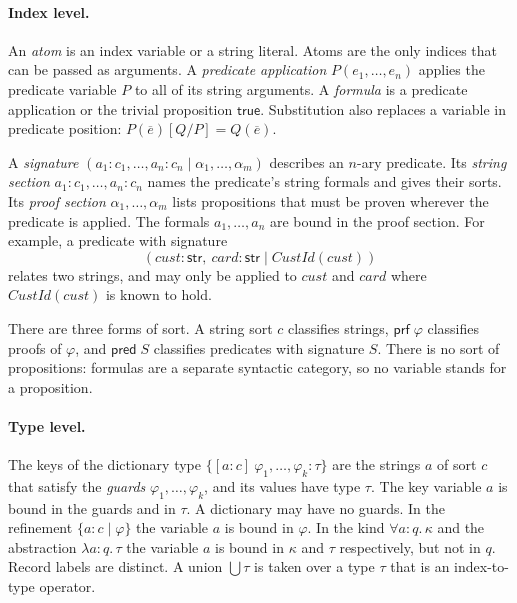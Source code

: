 \documentclass[11pt]{article}
\newcommand{\kw}[1]{\mathsf{#1}}
\newcommand{\str}{\kw{str}}
\newcommand{\prf}[1]{\kw{prf}\;#1}
\newcommand{\pred}[1]{\kw{pred}\;#1}
\newcommand{\true}{\kw{true}}
\newcommand{\kall}[3]{\forall #1 : #2.\,#3}
\newcommand{\gdict}[4]{\{[#1 : #2]\ #3 : #4\}}
\newcommand{\refine}[3]{\{#1 : #2 \mid #3\}}
\newcommand{\iabs}[3]{\lambda #1 : #2.\,#3}
\newcommand{\union}[1]{\textstyle\bigcup #1}
\theoremstyle{remark}
\begin{document}
\paragraph{Index level.}
An \emph{atom} is an index variable or a string literal. Atoms are the only indices that can be
passed as arguments. A \emph{predicate application} $P(e_1, \ldots, e_n)$ applies the predicate
variable $P$ to all of its string arguments. A \emph{formula} is a predicate application or the
trivial proposition $\true$. Substitution also replaces a variable in predicate position:
$P(\overline{e})[Q/P] = Q(\overline{e})$.

A \emph{signature} $(a_1 : c_1, \ldots, a_n : c_n \mid \alpha_1, \ldots, \alpha_m)$ describes an
$n$-ary predicate. Its \emph{string section} $a_1 : c_1, \ldots, a_n : c_n$ names the predicate's
string formals and gives their sorts. Its \emph{proof section} $\alpha_1, \ldots, \alpha_m$ lists
propositions that must be proven wherever the predicate is applied. The formals
$a_1, \ldots, a_n$ are bound in the proof section. For example, a predicate with signature
\[ (\mathit{cust} : \str,\ \mathit{card} : \str \mid \mathit{CustId}(\mathit{cust})) \]
relates two strings, and may only be applied to $\mathit{cust}$ and $\mathit{card}$ where
$\mathit{CustId}(\mathit{cust})$ is known to hold.

There are three forms of sort. A string sort $c$ classifies strings, $\prf{\varphi}$ classifies
proofs of $\varphi$, and $\pred{S}$ classifies predicates with signature $S$. There is no sort of
propositions: formulas are a separate syntactic category, so no variable stands for a
proposition.

\paragraph{Type level.}
The keys of the dictionary type $\gdict{a}{c}{\varphi_1, \ldots, \varphi_k}{\tau}$ are the strings
$a$ of sort $c$ that satisfy the \emph{guards} $\varphi_1, \ldots, \varphi_k$, and its values have
type $\tau$. The key variable $a$ is bound in the guards and in $\tau$. A dictionary may have no
guards. In the
refinement $\refine{a}{c}{\varphi}$ the variable $a$ is bound in $\varphi$. In the kind
$\kall{a}{q}{\kappa}$ and the abstraction $\iabs{a}{q}{\tau}$ the variable $a$ is bound in $\kappa$
and $\tau$ respectively, but not in $q$. Record labels are distinct. A union $\union{\tau}$ is taken
over a type $\tau$ that is an index-to-type operator.

\FloatBarrier
\end{document}

